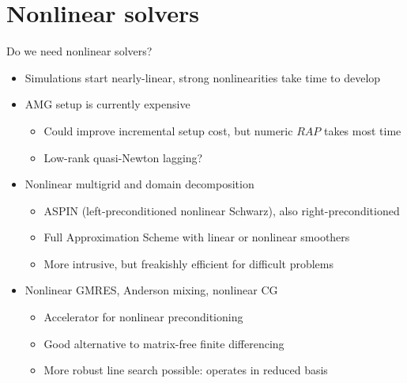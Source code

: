 \documentclass{beamer}
\begin{document}
\section{Nonlinear solvers}
\begin{frame}{Do we need nonlinear solvers?}
  \begin{itemize}
  \item Simulations start nearly-linear, strong nonlinearities take time to develop
  \item AMG setup is currently expensive
    \begin{itemize}
    \item Could improve incremental setup cost, but numeric $R A P$ takes most time
    \item Low-rank quasi-Newton lagging?
    \end{itemize}
  \item Nonlinear multigrid and domain decomposition
    \begin{itemize}
    \item ASPIN (left-preconditioned nonlinear Schwarz), also right-preconditioned
    \item Full Approximation Scheme with linear or nonlinear smoothers
    \item More intrusive, but freakishly efficient for difficult problems
    \end{itemize}
  \item Nonlinear GMRES, Anderson mixing, nonlinear CG
    \begin{itemize}
    \item Accelerator for nonlinear preconditioning
    \item Good alternative to matrix-free finite differencing
    \item More robust line search possible: operates in reduced basis
    \end{itemize}
  \end{itemize}
\end{frame}
\end{document}
